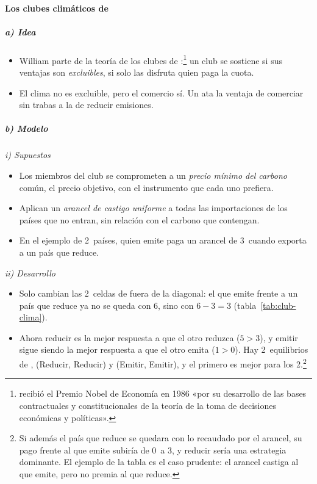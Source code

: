 \documentclass[11pt]{article}
\begin{document}
\paragraph{Los clubes climáticos de }

\subparagraph{a) Idea}

\begin{itemize}
\item William \textcite{Nordhaus2015Climate} parte de la teoría de los clubes de \textcite{Buchanan1965Economic}:\footnote{ recibió el Premio Nobel de Economía en 1986 «por su desarrollo de las bases contractuales y constitucionales de la teoría de la toma de decisiones económicas y políticas»\nocite{Nobel1986Buchanan}.} un club se sostiene si sus ventajas son \emph{excluibles}, si solo las disfruta quien paga la cuota.
\item El clima no es excluible, pero el comercio sí. Un  ata la ventaja de comerciar sin trabas a la de reducir emisiones.
\end{itemize}

\subparagraph{b) Modelo}

\hspace*{3.6em}\emph{i) Supuestos}

\begin{itemize}
\item Los miembros del club se comprometen a un \emph{precio mínimo del carbono} común, el precio objetivo, con el instrumento que cada uno prefiera.
\item Aplican un \emph{arancel de castigo uniforme} a todas las importaciones de los países que no entran, sin relación con el carbono que contengan.
\item En el ejemplo de 2~países, quien emite paga un arancel de 3~cuando exporta a un país que reduce.
\end{itemize}

\hspace*{3.6em}\emph{ii) Desarrollo}

\begin{itemize}
\item Solo cambian las 2~celdas de fuera de la diagonal: el que emite frente a un país que reduce ya no se queda con 6, sino con $6-3=3$ (tabla~\ref{tab:club-clima}).
\item Ahora reducir es la mejor respuesta a que el otro reduzca ($5>3$), y emitir sigue siendo la mejor respuesta a que el otro emita ($1>0$). Hay 2~equilibrios de , (Reducir, Reducir) y (Emitir, Emitir), y el primero es mejor para los 2.\footnote{Si además el país que reduce se quedara con lo recaudado por el arancel, su pago frente al que emite subiría de 0~a 3, y reducir sería una estrategia dominante. El ejemplo de la tabla es el caso prudente: el arancel castiga al que emite, pero no premia al que reduce.}
\end{itemize}
\end{document}
